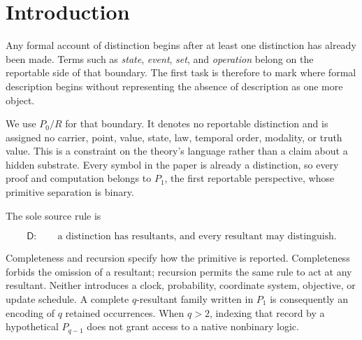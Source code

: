 \documentclass[11pt,a4paper]{article}
\begin{document}
\MakeResearchTitle
\MakeResearchContents
{}
\section{Introduction}

Any formal account of distinction begins after at least one distinction
has already been made. Terms such as \emph{state}, \emph{event},
\emph{set}, and \emph{operation} belong on the reportable side of that
boundary. The first task is therefore to mark where formal description
begins without representing the absence of description as one more
object.

We use \(P_{0}/R\) for that boundary. It denotes no reportable
distinction and is assigned no carrier, point, value, state, law,
temporal order, modality, or truth value. This is a constraint on the
theory's language rather than a claim about a hidden substrate. Every
symbol in the paper is already a distinction, so every proof and
computation belongs to \(P_{1}\), the first reportable perspective,
whose primitive separation is binary.

The sole source rule is

\[\mathsf{D}:\quad\quad\text{a distinction has resultants, and every resultant may distinguish.}\]

Completeness and recursion specify how the primitive is reported.
Completeness forbids the omission of a resultant; recursion permits the
same rule to act at any resultant. Neither introduces a clock,
probability, coordinate system, objective, or update schedule. A
complete \(q\)-resultant family written in \(P_{1}\) is consequently an
encoding of \(q\) retained occurrences. When \(q > 2\), indexing that
record by a hypothetical \(P_{q - 1}\) does not grant access to a native
nonbinary logic.
\end{document}
